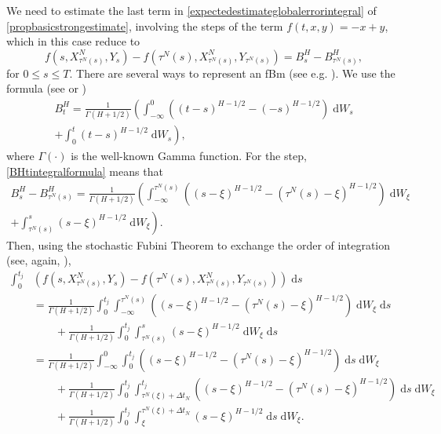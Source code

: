 \documentclass[reqno,12pt]{amsart}
\theoremstyle{plain} %
\theoremstyle{definition} %
\begin{document}
We need to estimate the last term in \eqref{expectedestimateglobalerrorintegral} of \cref{propbasicstrongestimate}, involving the steps of the term $f(t, x, y) = -x + y$, which in this case reduce to
\begin{equation}
    \label{stepfBm}
    f(s, X_{\tau^N(s)}^N, Y_s) - f(\tau^N(s), X_{\tau^N(s)}^N, Y_{\tau^N(s)}) = B^H_s - B^H_{\tau^N(s)},
\end{equation}
for $0 \leq s \leq T$. There are several ways to represent an fBm (see e.g. \cite{BHOB2008, Mishura2008}). We use the formula (see \cite[eq. (2.1)]{MandelbrotVanNess1968} or \cite[eq. (1.1)]{BHOB2008})
\begin{multline}
    \label{BHtintegralformula}
    B^H_t = \frac{1}{\Gamma(H + 1/2)}\left(\int_{-\infty}^0 \left( (t-s)^{H-1/2} - (-s)^{H-1/2}\right) \;\mathrm{d}W_s \right. \\
    \left. + \int_0^t (t - s)^{H-1/2} \;\mathrm{d}W_s\right),
\end{multline}
where $\Gamma(\cdot)$ is the well-known Gamma function. For the step, \eqref{BHtintegralformula} means that
\begin{multline}
    \label{BHtintegralformulastep}
    B^H_s - B^H_{\tau^N(s)} = \frac{1}{\Gamma(H + 1/2)}\left(\int_{-\infty}^{\tau^N(s)} \left( (s-\xi)^{H-1/2} - (\tau^N(s)-\xi)^{H-1/2}\right) \;\mathrm{d}W_\xi \right. \\
    \left. + \int_{\tau^N(s)}^s (s - \xi)^{H-1/2} \;\mathrm{d}W_\xi\right).
\end{multline}
Then, using the stochastic Fubini Theorem to exchange the order of integration (see, again, \cite[Section IV.6]{Protter2005}),
\begin{equation}
    \label{integralofstepfBm}
    \begin{aligned}
        \int_0^{t_j} & \left( f(s, X_{\tau^N(s)}^N, Y_s) - f(\tau^N(s), X_{\tau^N(s)}^N, Y_{\tau^N(s)}) \right)\;\mathrm{d}s \\
        & = \frac{1}{\Gamma(H + 1/2)}\int_0^{t_j} \int_{-\infty}^{\tau^N(s)} \left( (s-\xi)^{H-1/2} - (\tau^N(s)-\xi)^{H-1/2}\right) \;\mathrm{d}W_\xi \;\mathrm{d}s \\
        & \qquad + \frac{1}{\Gamma(H + 1/2)}\int_0^{t_j} \int_{\tau^N(s)}^s (s - \xi)^{H-1/2} \;\mathrm{d}W_\xi \;\mathrm{d}s \\
        & = \frac{1}{\Gamma(H + 1/2)}\int_{-\infty}^{0} \int_{0}^{t_j} \left( (s-\xi)^{H-1/2} - (\tau^N(s)-\xi)^{H-1/2}\right) \;\mathrm{d}s \;\mathrm{d}W_\xi \\
        & \qquad + \frac{1}{\Gamma(H + 1/2)}\int_{0}^{t_j} \int_{\tau^N(\xi)+\Delta t_N}^{t_j} \left( (s-\xi)^{H-1/2} - (\tau^N(s)-\xi)^{H-1/2}\right)  \;\mathrm{d}s \;\mathrm{d}W_\xi\\
        & \qquad + \frac{1}{\Gamma(H + 1/2)}\int_0^{t_j} \int_\xi^{\tau^N(\xi) + \Delta t_N} (s - \xi)^{H-1/2} \;\mathrm{d}s \;\mathrm{d}W_\xi. \\
    \end{aligned}
\end{equation}
\end{document}
